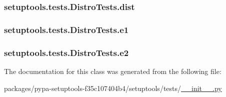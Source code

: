 \subsubsection[{dist}]{\setlength{\rightskip}{0pt plus 5cm}setuptools.\+tests.\+Distro\+Tests.\+dist}\label{classsetuptools_1_1tests_1_1DistroTests_abbcab990a748966290db6c85f6155789}
\hypertarget{classsetuptools_1_1tests_1_1DistroTests_ac949264471c76f3e1604d9bc0d6e0938}{}
\subsubsection[{e1}]{\setlength{\rightskip}{0pt plus 5cm}setuptools.\+tests.\+Distro\+Tests.\+e1}\label{classsetuptools_1_1tests_1_1DistroTests_ac949264471c76f3e1604d9bc0d6e0938}
\hypertarget{classsetuptools_1_1tests_1_1DistroTests_a57dec2ed22f628e4c2c3c96ef86bc74a}{}
\subsubsection[{e2}]{\setlength{\rightskip}{0pt plus 5cm}setuptools.\+tests.\+Distro\+Tests.\+e2}\label{classsetuptools_1_1tests_1_1DistroTests_a57dec2ed22f628e4c2c3c96ef86bc74a}


The documentation for this class was generated from the following file\+:\begin{DoxyCompactItemize}
\item 
packages/pypa-\/setuptools-\/f35c107404b4/setuptools/tests/\hyperlink{packages_2pypa-setuptools-f35c107404b4_2setuptools_2tests_2____init_____8py}{\+\_\+\+\_\+init\+\_\+\+\_\+.\+py}\end{DoxyCompactItemize}

